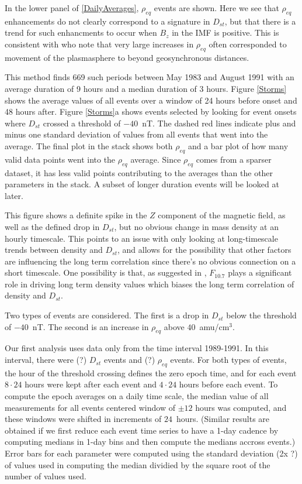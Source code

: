 \documentclass[10pt,twocolumn]{article}
\begin{document}
In the lower panel of \ref{DailyAverages}, $\rho_{eq}$ events are shown.  Here we see that $\rho_{eq}$ enhancements do not clearly correspond to a signature in $D_{st}$, but that there is a trend for such enhancments to occur when $B_{z}$ in the IMF is positive.  This is consistent with \cite{Takahashi2010} who note that very large increases in $\rho_{eq}$ often corresponded to movement of the plasmasphere to beyond geosynchronous distances. 

This method finds 669 such periods between May 1983 and August 1991 with an average duration of 9 hours and a median duration of 3 hours. Figure \ref{Storms} shows the average values of all events over a window of 24 hours before onset and 48 hours after. Figure \ref{Storms}a shows events selected by looking for event onsets where $D_{st}$ crossed a threshold of $-40$~nT. The dashed red lines indicate plus and minus one standard deviation of values from all events that went into the average. The final plot in the stack shows both $\rho_{eq}$ and a bar plot of how many valid data points went into the $\rho_{eq}$ average. Since $\rho_{eq}$ comes from a sparser dataset, it has less valid points contributing to the averages than the other parameters in the stack. A subset of longer duration events will be looked at later. 

This figure shows a definite spike in the $Z$ component of the magnetic field, as well as the defined drop in $D_{st}$, but no obvious change in mass density at an hourly timescale. This points to an issue with only looking at long-timescale trends between density and $D_{st}$, and allows for the possibility that other factors are influencing the long term correlation since there's no obvious connection on a short timescale. One possibility is that, as suggested in \cite{Takahashi2010}, $F_{10.7}$ plays a significant role in driving long term density values which biases the long term correlation of density and $D_{st}$.

Two types of events are considered. The first is a drop in $D_{st}$ below the threshold of $-40$~nT.  The second is an increase in $\rho_{eq}$ above $40$~amu/cm$^3$.

Our first analysis uses data only from the time interval 1989-1991.  In this interval, there were (?) $D_{st}$ events and (?) $\rho_{eq}$ events.  For both types of events, the hour of the threshold crossing defines the zero epoch time, and for each event $8\cdot24$ hours were kept after each event and $4\cdot24$ hours before each event.  To compute the epoch averages on a daily time scale, the median value of all measurements for all events centered window of $\pm 12$ hours was computed, and these windows were shifted in increments of $24$~hours. (Similar results are obtained if we first reduce each event time series to have a 1-day cadence by computing medians in 1-day bins and then compute the medians accross events.)  Error bars for each parameter were computed using the standard deviation (2x ?) of values used in computing the median dividied by the square root of the number of values used.
\end{document}
